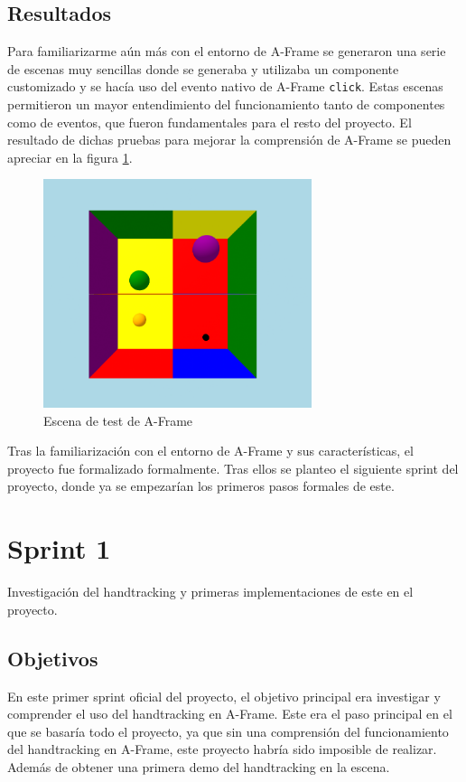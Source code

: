 \documentclass[a4paper, 12pt]{book}
\begin{document}
\subsection{Resultados}
\label{subsec:resultados0}
Para familiarizarme aún más con el entorno de A-Frame se generaron una serie de escenas muy sencillas donde se generaba y utilizaba un componente customizado y se hacía uso del evento nativo de A-Frame \texttt{click}. Estas escenas permitieron un mayor entendimiento del funcionamiento tanto de componentes como de eventos, que fueron fundamentales para el resto del proyecto.
El resultado de dichas pruebas para mejorar la comprensión de A-Frame se pueden apreciar en la figura \ref{fig:sprint0}.
\begin{figure}[H] 
  \centering
  \includegraphics[width=0.7\textwidth]{img/primera_escena.png} 
  \caption{Escena de test de A-Frame}
  \label{fig:sprint0}
\end{figure}

Tras la familiarización con el entorno de A-Frame y sus características, el proyecto fue formalizado formalmente. Tras ellos se planteo el siguiente sprint del proyecto, donde ya se empezarían los primeros pasos formales de este. 

\section{Sprint 1}
\label{sec:sprint1}
Investigación del handtracking y primeras implementaciones de este en el proyecto.

\subsection{Objetivos}
\label{subsec:objetivo-principal1}
En este primer sprint oficial del proyecto, el objetivo principal era investigar y comprender el uso del handtracking en A-Frame. 
Este era el paso principal en el que se basaría todo el proyecto, ya que sin una comprensión del funcionamiento del handtracking en A-Frame, este proyecto habría sido imposible de realizar.
Además de obtener una primera demo del handtracking en la escena.
\end{document}
